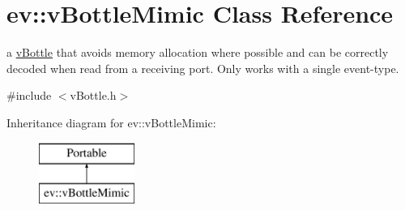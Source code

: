 \hypertarget{classev_1_1vBottleMimic}{}\section{ev\+:\+:v\+Bottle\+Mimic Class Reference}
\label{classev_1_1vBottleMimic}


a \hyperlink{classev_1_1vBottle}{v\+Bottle} that avoids memory allocation where possible and can be correctly decoded when read from a receiving port. Only works with a single event-\/type.  




{\ttfamily \#include $<$v\+Bottle.\+h$>$}

Inheritance diagram for ev\+:\+:v\+Bottle\+Mimic\+:\begin{figure}[H]
\begin{center}
\leavevmode
\includegraphics[height=2.000000cm]{classev_1_1vBottleMimic}
\end{center}
\end{figure}
